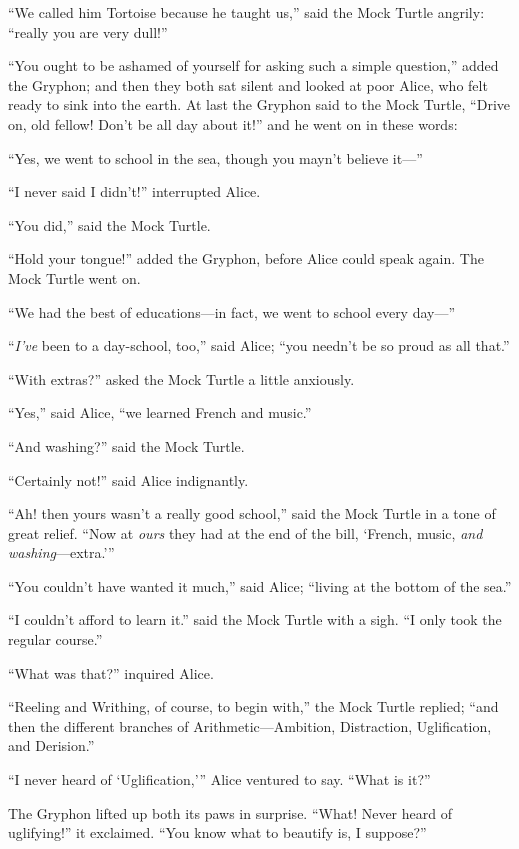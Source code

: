 \documentclass[11pt,openany,oneside]{book}
\begin{document}
“We called him Tortoise because he taught us,” said the Mock Turtle angrily: “really you are very dull!” 

“You ought to be ashamed of yourself for asking such a simple question,” added the Gryphon; and then they both sat silent and looked at poor Alice, who felt ready to sink into the earth. At last the Gryphon said to the Mock Turtle, “Drive on, old fellow! Don’t be all day about it!” and he went on in these words: 

“Yes, we went to school in the sea, though you mayn’t believe it—” 

“I never said I didn’t!” interrupted Alice. 

“You did,” said the Mock Turtle. 

“Hold your tongue!” added the Gryphon, before Alice could speak again. The Mock Turtle went on. 

“We had the best of educations—in fact, we went to school every day—” 

“{\em I’ve\/} been to a day-school, too,” said Alice; “you needn’t be so proud as all that.” 

“With extras?” asked the Mock Turtle a little anxiously. 

“Yes,” said Alice, “we learned French and music.” 

“And washing?” said the Mock Turtle. 

“Certainly not!” said Alice indignantly. 

“Ah! then yours wasn’t a really good school,” said the Mock Turtle in a tone of great relief. “Now at {\em ours\/} they had at the end of the bill, ‘French, music, {\em and washing\/}—extra.’” 

“You couldn’t have wanted it much,” said Alice; “living at the bottom of the sea.” 

“I couldn’t afford to learn it.” said the Mock Turtle with a sigh. “I only took the regular course.” 

“What was that?” inquired Alice. 

“Reeling and Writhing, of course, to begin with,” the Mock Turtle replied; “and then the different branches of Arithmetic—Ambition, Distraction, Uglification, and Derision.” 

“I never heard of ‘Uglification,’” Alice ventured to say. “What is it?” 

The Gryphon lifted up both its paws in surprise. “What! Never heard of uglifying!” it exclaimed. “You know what to beautify is, I suppose?” 
\end{document}
